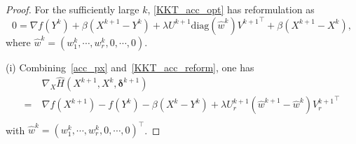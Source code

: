 \documentclass[twoside,11pt]{article}
\numberwithin{equation}{section}
\begin{document}
 \begin{proof}
   For the sufficiently large $k $,   \eqref{KKT_acc_opt} has reformulation as
   \begin{equation}\label{KKT_acc_reform}
     0= \nabla f (Y^{k}) + \beta (X^{k+1}-Y^{k}) + \lambda U^{k+1}\mathrm{diag} \left(\hat{w}^{k}\right){V^{k+1}}^{\top} + \beta(X^{k+1} - X^{k}),
   \end{equation}
   where $\hat{w}^{k} =  (w_{1}^{k},\cdots,w_{r}^{k},0,\cdots,0 ) $.  
 
 (i)     Combining~\eqref{acc_px} and~\eqref{KKT_acc_reform}, one has 
     \begin{equation}\label{partial_hatH}
       \begin{aligned} 
         & \ \nabla_{X} \hat{H} (X^{k+1},X^{k},\bm{\delta}^{k+1} ) \\
     =&\  \nabla f (X^{k+1}) - f(Y^{k}) - \beta (X^{k}-Y^{k}) +\lambda U_{r}^{k+1}  \left(\hat{w}^{k+1}-\hat{w}^{k}\right){V_{r}^{k+1}}^{\top} \\       
     \end{aligned}\end{equation}
     with $\hat{w}^{k} =  \left(w_{1}^{k},\cdots,w_{r}^{k},0,\cdots,0\right)^{\top} $. 
 

\end{proof}
\end{document}
